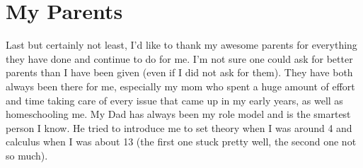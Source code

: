 

\section*{My Parents}
Last but certainly not least, I'd like to thank my awesome parents for everything they have done and continue to do for me.
I'm not sure one could ask for better parents than I have been given (even if I did not ask for them).
They have both always been there for me, especially my mom who spent a huge amount of effort and time taking care of every issue that came up in my early years, as well as homeschooling me.
My Dad has always been my role model and is the smartest person I know.
He tried to introduce me to set theory when I was around 4 and calculus when I was about 13 (the first one stuck pretty well, the second one not so much).
